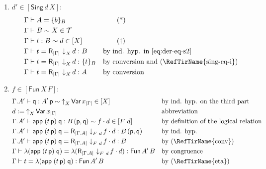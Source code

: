 \documentclass{LMCS}
\theoremstyle{plain}\newtheorem{satz}[thm]{Satz}
\newcommand{\proofLine}[2]{&#1&&\text{#2}}
\newcommand{\ctxe}[2]{#1.#2}
\newcommand{\exsubs}[2]{( #1, #2)}
\newcommand{\subsTm}[2]{#1\,#2}
\newcommand{\subsTy}[2]{#1\,#2}
\newcommand{\F}[2]{\mathsf{Fun}\,#1\,#2}
\newcommand{\p}{\mathsf{p}}
\newcommand{\q}{\mathsf{q}}
\newcommand{\appTm}[2]{\mathsf{app}\;#1\;#2} \newcommand{\singTm}[2]{\{#1\}_{#2}}
\newcommand{\dtype}[2]{#1\vdash#2}
\newcommand{\dterm}[3]{#1\vdash#3:#2}
\newcommand{\deqtype}[3]{#1\vdash#2=#3}
\newcommand{\deqterm}[4]{#1\vdash#3=#4:#2}
\newcommand{\upa}[2]{\mathop{\uparrow}\nolimits_{#1}{#2}}
\newcommand{\da}[2]{\mathop{\downarrow}\nolimits_{#1}{#2}}
\newcommand{\reifyC}[2]{\mathsf{R}_{|#1|}\,#2}
\newcommand{\perT}{\mathcal{T}}
\newcommand{\rel}{\sim}
\newcommand{\iVar}[1]{\mathsf{Var}\,x_{#1}}
\newcommand{\iPi}[2]{\mathsf{Fun}\,#1\,#2}
\newcommand{\iSing}[2]{\mathsf{Sing}\,#1\,{#2}}
\newcommand{\ruleref}[1]{(\RefTirName{#1})}
\begin{document}
{\begin{enumerate}[(a)]
    \begin{enumerate}[(1)]
    \item $d' \in [\iSing{d}{X}]$: 
      \begin{align*}
        \proofLine{\deqtype{\Gamma}{A}{\singTm{b}{B}}}{} \tag{*}\label{eq:der-eq-s1}\\
        \proofLine{\dtype{\Gamma}{B}\rel X \in \perT}{}\\
        \proofLine{\dterm{\Gamma}{B}{t}\rel d\in [X]}{} \tag{\textdagger}\label{eq:der-eq-s2} \\
        \proofLine{\deqterm{\Gamma}{B}{t}{\reifyC{\Gamma}{\da{X}{d}}}}{by ind. hyp.  in \eqref{eq:der-eq-s2}}\\
        \proofLine{\deqterm{\Gamma}{\singTm{t}{B}}{t}{\reifyC{\Gamma}{\da{X}{d}}}}{by conversion and \ruleref{sing-eq-i}}\\
        \proofLine{\deqterm{\Gamma}{A}{t}{\reifyC{\Gamma}{\da{X}{d}}}}{by conversion}
      \end{align*}
      \item $f \in [\iPi{X}{F}]$:
        \begin{align*}
          \proofLine{\dterm{\ctxe{\Gamma}{A'}}{\subsTy{A'}{\p}}{\q}\rel
            \upa{X}{\iVar{|\Gamma|}} \in [X]}{by ind. hyp.  on the third part}\\
          \proofLine{d := \upa{X}{\iVar{|\Gamma|}}}{abbreviation}\\
          \proofLine{\dterm{\ctxe{\Gamma}{A'}}{\subsTy{B}{\exsubs{\p}{\q}}}
            {\appTm{(\subsTm{t}{\p})}{\q}}\rel f\cdot d\in [F\ d]}
          {by definition of the logical relation}\\
          \proofLine{\deqterm{\ctxe{\Gamma}{A'}}{\subsTy{B}{\exsubs{\p}{\q}}}
            {\appTm{(\subsTm{t}{\p})}{\q}}{\reifyC{\ctxe{\Gamma}{A}}{\da{F\
                  d}{f\cdot d}}}}{by ind. hyp. }\\
          \proofLine{\deqterm{\ctxe{\Gamma}{A'}}{B}
            {\appTm{(\subsTm{t}{\p})}{\q}}{\reifyC{\ctxe{\Gamma}{A}}{\da{F\
                  d}{f\cdot
                  d}}}}{by \ruleref{conv}} \\
          \proofLine{\deqterm{\Gamma}{\F{A'}{B}} {\lambda
              (\appTm{(\subsTm{t}{\p})}{\q})}{\lambda
              (\reifyC{\ctxe{\Gamma}{A}}{\da{F\ d}{f\cdot
                  d}})}}{by congruence} \\
          \proofLine{\deqterm{\Gamma}{\F{A'}{B}} {t}{\lambda
              (\appTm{(\subsTm{t}{\p})}{\q})}}{by \ruleref{eta}}\\

\end{align*}
\end{enumerate}
\end{enumerate}}
\end{document}
